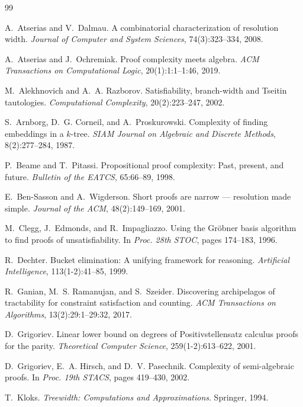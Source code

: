 \documentclass[11pt]{article}
\begin{document}
\begin{thebibliography}{99}

A.~Atserias and V.~Dalmau.
A combinatorial characterization of resolution width.
\emph{Journal of Computer and System Sciences}, 74(3):323--334, 2008.

A.~Atserias and J.~Ochremiak.
Proof complexity meets algebra.
\emph{ACM Transactions on Computational Logic}, 20(1):1:1--1:46, 2019.

M.~Alekhnovich and A.~A. Razborov.
Satisfiability, branch-width and Tseitin tautologies.
\emph{Computational Complexity}, 20(2):223--247, 2002.

S.~Arnborg, D.~G. Corneil, and A.~Proskurowski.
Complexity of finding embeddings in a $k$-tree.
\emph{SIAM Journal on Algebraic and Discrete Methods}, 8(2):277--284, 1987.

P.~Beame and T.~Pitassi.
Propositional proof complexity: Past, present, and future.
\emph{Bulletin of the EATCS}, 65:66--89, 1998.

E.~Ben-Sasson and A.~Wigderson.
Short proofs are narrow --- resolution made simple.
\emph{Journal of the ACM}, 48(2):149--169, 2001.

M.~Clegg, J.~Edmonds, and R.~Impagliazzo.
Using the Gr\"obner basis algorithm to find proofs of unsatisfiability.
In \emph{Proc. 28th STOC}, pages 174--183, 1996.

R.~Dechter.
Bucket elimination: A unifying framework for reasoning.
\emph{Artificial Intelligence}, 113(1-2):41--85, 1999.

R.~Ganian, M.~S. Ramanujan, and S.~Szeider.
Discovering archipelagos of tractability for constraint satisfaction and counting.
\emph{ACM Transactions on Algorithms}, 13(2):29:1--29:32, 2017.

D.~Grigoriev.
Linear lower bound on degrees of Positivstellensatz calculus proofs for the parity.
\emph{Theoretical Computer Science}, 259(1-2):613--622, 2001.

D.~Grigoriev, E.~A. Hirsch, and D.~V. Pasechnik.
Complexity of semi-algebraic proofs.
In \emph{Proc. 19th STACS}, pages 419--430, 2002.

T.~Kloks.
\emph{Treewidth: Computations and Approximations}.
Springer, 1994.


\end{thebibliography}
\end{document}
